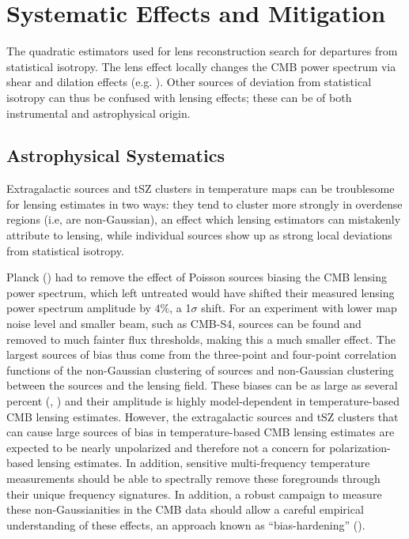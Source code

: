 \section{Systematic Effects and Mitigation}\label{syst}
The quadratic estimators used for lens reconstruction search for departures from statistical isotropy.  The lens effect locally changes the CMB power spectrum via shear and dilation effects (e.g. \cite{Bucher:2010iv}).  Other sources of deviation from statistical isotropy can thus be confused with lensing effects; these can be of both instrumental and astrophysical origin.

\subsection{Astrophysical Systematics}\label{systAst}
	
Extragalactic sources and tSZ clusters in temperature maps can be troublesome for lensing estimates in two ways: they tend to cluster more strongly in overdense regions (i.e, are non-Gaussian), an effect which
lensing estimators can mistakenly attribute to lensing, while individual sources show up as strong local deviations from statistical isotropy.  

Planck (\cite{Ade:2013tyw}) had to remove the effect of Poisson sources biasing the CMB lensing power spectrum, which left untreated would have shifted their measured lensing power spectrum amplitude by $4\%$, a  1$\sigma$ shift.  For an experiment with lower map noise level and smaller beam, such as CMB-S4, sources can be found and removed to much fainter flux thresholds, making this a much smaller effect.  The largest sources of bias thus come from the three-point and four-point correlation functions of the non-Gaussian clustering of sources and non-Gaussian clustering between the sources and the lensing field.  These biases can be as large as several percent (\cite{vanEngelen:2013rla}, \cite{Osborne:2013nna}) and their amplitude is highly model-dependent in temperature-based CMB lensing estimates. However, the extragalactic sources and tSZ clusters that can cause large sources of bias in temperature-based CMB lensing estimates are expected to be nearly unpolarized and therefore not a concern for polarization-based lensing estimates. In
addition, sensitive multi-frequency temperature measurements should be able to spectrally remove these foregrounds through their unique frequency
signatures. In addition, a robust campaign to measure these non-Gaussianities in the CMB data should allow a careful empirical understanding of these
effects, an approach known as ``bias-hardening'' (\cite{Osborne:2013nna}).  

